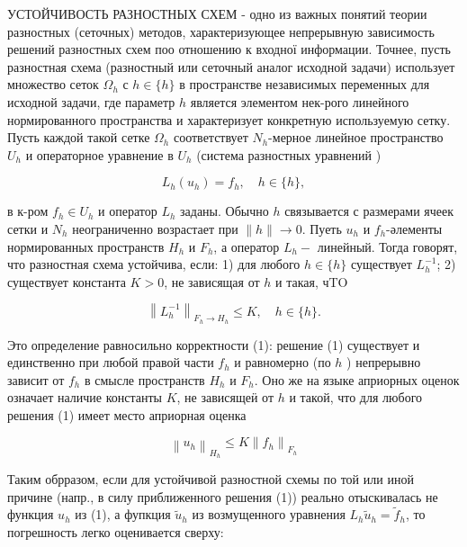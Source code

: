 \documentclass[10pt]{article}
\begin{document}
УСТОЙЧИВОСТЬ РАЗНОСТНЫХ СХЕМ - одно из важных понятий теории разностных (сеточных) методов, характеризующее непрерывную зависимость решений разностных схем поо отношению к входної информации. Точнее, пусть разностная схема (разностный или сеточный аналог исходной задачи) использует множество сеток $\Omega_{h}$ с $h \in\{h\}$ в пространстве независимых переменных для исходной задачи, где параметр $h$ является элементом нек-рого линейного нормированного пространства и характеризует конкретную используемую сетку. Пусть каждой такой сетке $\Omega_{h}$ соответствует $N_{h}$-мерное линейное пространство $U_{h}$ и операторное уравнение в $U_{h}$ (система разностных уравнений )



\[

L_{h}\left(u_{h}\right)=f_{h}, \quad h \in\{h\},

\]



в к-ром $f_{h} \in U_{h}$ и оператор $L_{h}$ заданы. Обычно $h$ связывается с размерами ячеек сетки и $N_{h}$ неограниченно возрастает при $\|h\| \longrightarrow 0$. Пуеть $u_{h}$ и $f_{h}$-әлементы нормированных пространств $H_{h}$ и $F_{h}$, а оператор $L_{h}-$ линейный. Тогда говорят, что разностная схема устойчива, если: 1) для любого $h \in\{h\}$ существует $L_{h}^{-1}$; 2) существует константа $K>0$, не зависящая от $h$ и такая, чTO



\[

\left\|L_{h}^{-1}\right\|_{F_{h} \rightarrow H_{h}} \leqslant K, \quad h \in\{h\} .

\]



Это определение равносильно корректности (1): решение (1) существует и единственно при любой правой части $f_{h}$ и равномерно (по $h$ ) непрерывно зависит от $f_{h}$ в смысле пространств $H_{h}$ и $F_{h}$. Оно же на языке априорных оценок означает наличие константы $K$, не зависящеӥ от $h$ и такой, что для любого решения (1) имеет место априорная оценка



\[

\left\|u_{h}\right\|_{H_{h}} \leqslant K\left\|f_{h}\right\|_{F_{h}}

\]



Таким обрразом, если для устойчивой разностной схемы по той или иной причине (напр., в силу приближенного решения (1)) реально отыскивалась не функция $u_{h}$ из (1), а фупкция $\tilde{u}_{h}$ из возмущенного уравнения $L_{h} \tilde{u}_{h}=\tilde{f}_{h}$, то погрешность легко оценивается сверху:
\end{document}
